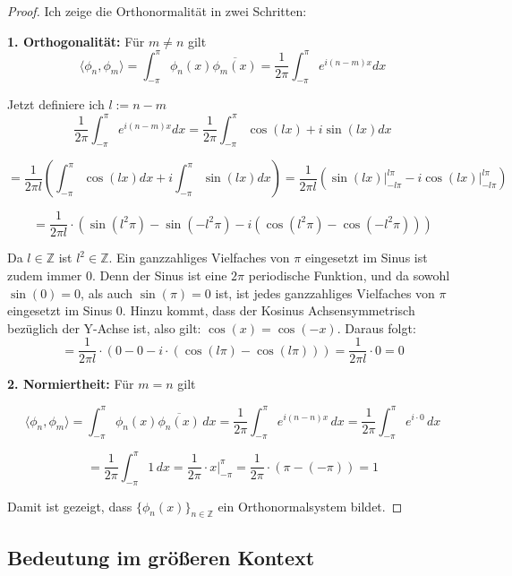 \documentclass[a4paper,12pt]{article}
\theoremstyle{definition}
\theoremstyle{remark}
\begin{document}
    \begin{proof}
        Ich zeige die Orthonormalität in zwei Schritten: 
            
        \textbf{1. Orthogonalität:}  
        Für $m \neq n$ gilt
        $$\langle \phi_n, \phi_m \rangle = \int_{-\pi}^{\pi}{\phi_n(x) \overline{\phi_m(x)}} = \frac{1}{2\pi}\int_{-\pi}^\pi{e^{i(n-m)x}dx}$$
            
        Jetzt definiere ich $l := n-m$
        \[\frac{1}{2\pi}\int_{-\pi}^\pi{e^{i(n-m)x}dx} = \frac{1}{2\pi}\int_{-\pi}^\pi{\cos(lx) + i \sin (lx)} dx\] 
            
        \[= \frac{1}{2\pi l}\left(\int_{-\pi}^\pi{\cos (lx) dx} + i\int_{-\pi}^\pi{ \sin (lx) dx} \right)  = \frac{1}{2\pi l} \left(\sin(lx)\big|_{-l\pi}^{l\pi} - i\cos(lx)\big|_{-l\pi}^{l\pi} \right)\]
            
        \[= \frac{1}{2\pi l} \cdot \left(\sin(l^2\pi) - \sin(-l^2\pi) - i\left(\cos(l^2\pi) - \cos(-l^2\pi)\right)\right) \]
            
        Da $l\in \mathbb{Z}$ ist $l^2 \in \mathbb{Z}$. Ein ganzzahliges Vielfaches von $\pi$
        eingesetzt im Sinus ist zudem immer 0. Denn der Sinus ist eine $2\pi$ periodische Funktion, und da
        sowohl $\sin(0) = 0$, als auch $\sin (\pi) = 0$ ist, ist jedes ganzzahliges Vielfaches von $\pi$ eingesetzt 
        im Sinus 0. Hinzu kommt, dass der Kosinus Achsensymmetrisch bezüglich der Y-Achse ist, also gilt:
        $\cos (x) =  \cos (-x)$. Daraus folgt:
        \[= \frac{1}{2\pi l} \cdot (0 - 0 - i\cdot(\cos(l\pi) - \cos(l\pi))) = \frac{1}{2\pi l} \cdot 0 = 0\]
            
            
        \textbf{2. Normiertheit:}  
        Für $m = n$ gilt
            
        \[\langle \phi_n, \phi_m \rangle = \int_{-\pi}^{\pi} \phi_n(x) \overline{\phi_n(x)} \, dx = \frac{1}{2\pi} \int_{-\pi}^{\pi} e^{i(n -n) x}\, dx = \frac{1}{2\pi} \int_{-\pi}^{\pi} e^{i\cdot0} \, dx\]
            
        \[= \frac{1}{2\pi} \int_{-\pi}^{\pi} 1 \, dx = \frac{1}{2\pi} \cdot x \Big|_{-\pi}^{\pi} = \frac{1}{2\pi} \cdot (\pi-(-\pi)) = 1\]
            
        Damit ist gezeigt, dass $\{\phi_n(x)\}_{n\in\mathbb{Z}}$ ein Orthonormalsystem bildet.
        \end{proof}
\subsection{Bedeutung im größeren Kontext}
        
\end{document}
